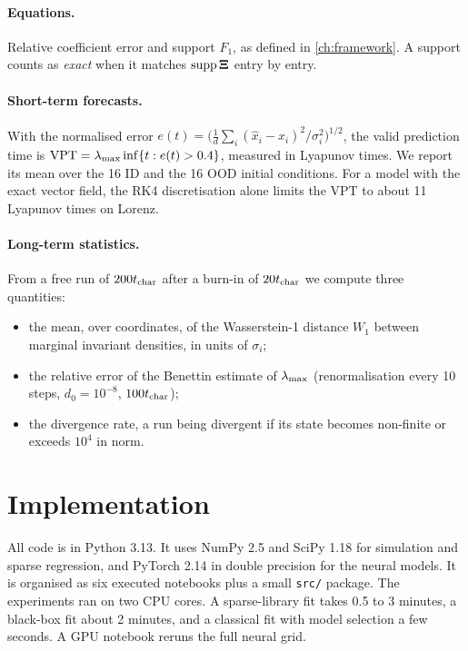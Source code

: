 \paragraph{Equations.} Relative coefficient error and support $F_1$, as defined in \cref{ch:framework}. A support counts as \emph{exact} when it matches $\operatorname{supp}\bm{\Xi}$ entry by entry.

\paragraph{Short-term forecasts.} With the normalised error $e(t)=\big(\frac1d\sum_i(\hat x_i-x_i)^2/\sigma_i^2\big)^{1/2}$, the valid prediction time is $\mathrm{VPT}=\lambda_{\max}\inf\{t:e(t)>0.4\}$, measured in Lyapunov times. We report its mean over the 16 ID and the 16 OOD initial conditions. For a model with the exact vector field, the RK4 discretisation alone limits the VPT to about 11 Lyapunov times on Lorenz.

\paragraph{Long-term statistics.} From a free run of $200t_{\mathrm{char}}$ after a burn-in of $20t_{\mathrm{char}}$ we compute three quantities:
\begin{itemize}
  \item the mean, over coordinates, of the Wasserstein-1 distance $W_1$ between marginal invariant densities, in units of $\sigma_i$;
  \item the relative error of the Benettin estimate of $\lambda_{\max}$ (renormalisation every 10 steps, $d_0=10^{-8}$, $100t_{\mathrm{char}}$);
  \item the divergence rate, a run being divergent if its state becomes non-finite or exceeds $10^4$ in norm.
\end{itemize}

\section{Implementation}

All code is in Python 3.13. It uses NumPy 2.5 and SciPy 1.18 for simulation and sparse regression, and PyTorch 2.14 in double precision for the neural models. It is organised as six executed notebooks plus a small \texttt{src/} package. The experiments ran on two CPU cores. A sparse-library fit takes 0.5 to 3 minutes, a black-box fit about 2 minutes, and a classical fit with model selection a few seconds. A GPU notebook reruns the full neural grid.
